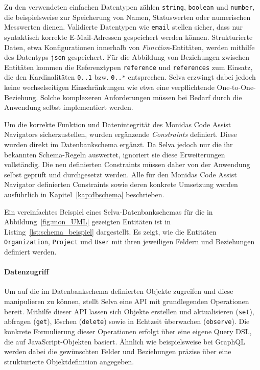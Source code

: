Zu den verwendeten einfachen Datentypen zählen \texttt{string}, \texttt{boolean} und \texttt{number}, die beispielsweise zur Speicherung von Namen, Statuswerten oder numerischen Messwerten dienen. Validierte Datentypen wie \texttt{email} stellen sicher, dass nur syntaktisch korrekte E-Mail-Adressen gespeichert werden können. Strukturierte Daten, etwa Konfigurationen innerhalb von \textit{Function}-Entitäten, werden mithilfe des Datentyps \texttt{json} gespeichert. Für die Abbildung von Beziehungen zwischen Entitäten kommen die Referenztypen \texttt{reference} und \texttt{references} zum Einsatz, die den Kardinalitäten \texttt{0..1} bzw. \texttt{0..*} entsprechen. Selva erzwingt dabei jedoch keine wechselseitigen Einschränkungen wie etwa eine verpflichtende One-to-One-Beziehung. Solche komplexeren Anforderungen müssen bei Bedarf durch die Anwendung selbst implementiert werden.



Um die korrekte Funktion und Datenintegrität des Monidas Code Assist Navigators sicherzustellen, wurden ergänzende \textit{Constraints} definiert. Diese wurden direkt im Datenbankschema ergänzt. Da Selva jedoch nur die ihr bekannten Schema-Regeln auswertet, ignoriert sie diese Erweiterungen vollständig. Die neu definierten Constraints müssen daher von der Anwendung selbst geprüft und durchgesetzt werden. Alle für den Monidas Code Assist Navigator definierten Constraints sowie deren konkrete Umsetzung werden ausführlich in Kapitel~\ref{kap:dbschema} beschrieben.

Ein vereinfachtes Beispiel eines Selva-Datenbankschemas für die in Abbildung~\ref{fig:mon_UML} gezeigten Entitäten ist in Listing~\ref{lst:schema_beispiel} dargestellt. Es zeigt, wie die Entitäten \texttt{Organization}, \texttt{Project} und \texttt{User} mit ihren jeweiligen Feldern und Beziehungen definiert werden.

\newpage





\paragraph{Datenzugriff}
Um auf die im Datenbankschema definierten Objekte zugreifen und diese manipulieren zu können, stellt Selva eine API mit grundlegenden Operationen bereit. Mithilfe dieser API lassen sich Objekte erstellen und aktualisieren (\texttt{set}), abfragen (\texttt{get}), löschen (\texttt{delete}) sowie in Echtzeit überwachen (\texttt{observe}). Die konkrete Formulierung dieser Operationen erfolgt über eine eigene Query DSL, die auf JavaScript-Objekten basiert. Ähnlich wie beispielsweise bei GraphQL werden dabei die gewünschten Felder und Beziehungen präzise über eine strukturierte Objektdefinition angegeben.

